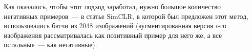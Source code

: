 Как оказалось, чтобы этот подход заработал, нужно большое количество негативных примеров~--- 
в статье SimCLR, в которой был предложен этот метод, использовались батчи из 2048 изображений 
(аугментированная версия $i$-го изображения рассматривалась как позитивный пример для него же, а все остальные~--- как негативные).